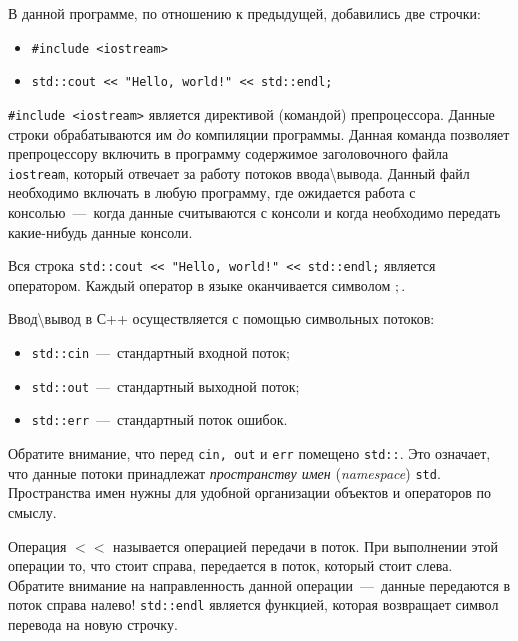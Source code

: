 В данной программе, по отношению к предыдущей, добавились две строчки:

\begin{itemize}
    \item \lstinline!#include <iostream>!
    \item \lstinline|std::cout << "Hello, world!" << std::endl;|
\end{itemize}

\lstinline!#include <iostream>! является директивой (командой) препроцессора. Данные строки обрабатываются им \emph{до} компиляции программы. Данная команда позволяет препроцессору включить в программу содержимое заголовочного файла \lstinline!iostream!, который отвечает за работу потоков ввода\textbackslash вывода. Данный файл необходимо включать в любую программу, где ожидается работа с консолью~---~когда данные считываются с консоли и когда необходимо передать какие-нибудь данные консоли.

Вся строка \lstinline|std::cout << "Hello, world!" << std::endl;| является оператором. Каждый оператор в языке оканчивается символом $;$.

Ввод\textbackslash вывод в С++ осуществляется с помощью символьных потоков:
\begin{itemize}
    \item \lstinline!std::cin!~---~стандартный входной поток;
    \item \lstinline!std::out!~---~стандартный выходной поток;
    \item \lstinline!std::err!~---~стандартный поток ошибок.
\end{itemize}

Обратите внимание, что перед \lstinline|cin, out| и \lstinline|err| помещено \texttt{std::}. Это означает, что данные потоки принадлежат \textit{пространству имен} (\textit{namespace}) \texttt{std}. Пространства имен нужны для удобной организации объектов и операторов по смыслу.

Операция $<<$ называется $\textit{операцией передачи в поток}$. При выполнении этой операции то, что стоит справа, передается в поток, который стоит слева. Обратите внимание на направленность данной операции~---~данные передаются в поток справа налево! \lstinline|std::endl| является функцией, которая возвращает символ перевода на новую строчку.

